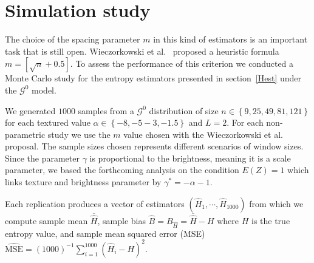 \documentclass[journal]{IEEEtran}
\begin{document}
\section{Simulation study}\label{sec:simulation}

The choice of the spacing parameter $m$ in this kind of estimators is an important task that is still open. Wieczorkowski et al.~\cite{Wieczorkowski1999} proposed a heuristic formula $m=[\sqrt{n}+0.5]$. To assess the performance of this criterion we conducted a Monte Carlo study for the entropy estimators presented in section~\ref{Hest} under the $\mathcal{G}^0$ model.

We generated $1000$ samples from a $\mathcal{G}^0$ distribution of size $n \in\left\lbrace 9,25,49,81,121\right\rbrace $ for each textured value $\alpha \in\left\lbrace -8,-5-3,-1.5\right\rbrace $ and $L=2$. For each non-parametric study we use the $m$ value chosen with the Wieczorkowski et al. proposal.
The sample sizes chosen represents different scenarios of window sizes. Since the parameter $\gamma$ is proportional to the brightness, meaning it is a scale parameter, we based the forthcoming analysis on the condition $E(Z)=1$ which links texture and brightness parameter by $\gamma^* =-\alpha-1$. 

Each replication produces a vector  of estimators $(\widehat{H}_1, \cdots, \widehat{H}_{1000})$ from which we compute sample mean $\overline{\widehat{H}}$, 
sample bias $\widehat{B}=B_{\widehat{H}} = \overline{\widehat{H}}- H$ where $H$ is the true entropy value, and sample mean squared error (MSE) $\widehat{\textrm{MSE}}=({1000})^{-1}{\sum_{i=1}^{1000}{(\widehat{H}_i-H)^2}}$.
\end{document}
